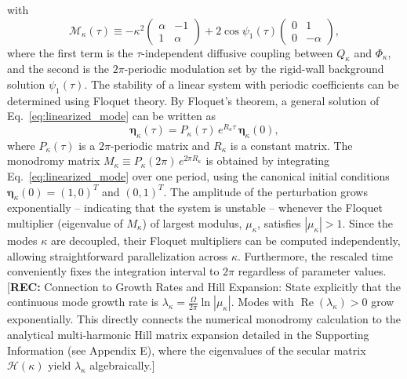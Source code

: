 \documentclass[prb,aps,twocolumn,superscriptaddress,floatfix]{revtex4-1}
\newcommand{\rec}[1]{{\color{magenta}[\textbf{REC:} #1]}}
\begin{document}
%
with
%
\begin{equation}
    \mathcal{M}_\kappa(\tau) \equiv -\kappa^2
    \begin{pmatrix}
    \alpha & -1 \\
    1 & \alpha
    \end{pmatrix}
    + 2\cos\psi_1(\tau)
    \begin{pmatrix}
    0 & 1 \\
    0 & -\alpha
    \end{pmatrix},
    \label{eq:stability_matrix_split}
\end{equation}
%
where the first term is the $\tau$-independent diffusive coupling between $Q_\kappa$ and $\Phi_\kappa$, and the second is the $2\pi$-periodic modulation set by the rigid-wall background solution $\psi_1(\tau)$. The stability of a linear system with periodic coefficients can be determined using Floquet theory. By Floquet's theorem, a general solution of Eq.~\eqref{eq:linearized_mode} can be written as
%
\begin{equation}
    \boldsymbol{\eta}_{\kappa}(\tau) = P_\kappa(\tau)\,e^{R_\kappa\tau}\,\boldsymbol{\eta}_\kappa(0),
\end{equation}
%
where $P_\kappa(\tau)$ is a $2\pi$-periodic matrix and $R_\kappa$ is a constant matrix. The monodromy matrix $M_\kappa \equiv P_\kappa(2\pi)\,e^{2\pi R_\kappa}$ is obtained by integrating Eq.~\eqref{eq:linearized_mode} over one period, using the canonical initial conditions $\boldsymbol{\eta}_\kappa(0) = (1,0)^T$ and $(0,1)^T$. The amplitude of the perturbation grows exponentially -- indicating that the system is unstable -- whenever the Floquet multiplier (eigenvalue of $M_\kappa$) of largest modulus, $\mu_\kappa$, satisfies $|\mu_\kappa|>1$. Since the modes $\kappa$ are decoupled, their Floquet multipliers can be computed independently, allowing straightforward parallelization across $\kappa$. Furthermore, the rescaled time conveniently fixes the integration interval to $2\pi$ regardless of parameter values.
\rec{Connection to Growth Rates and Hill Expansion: State explicitly that the continuous mode growth rate is $\lambda_\kappa = \frac{\Omega}{2\pi}\ln|\mu_\kappa|$. Modes with $\operatorname{Re}(\lambda_\kappa)>0$ grow exponentially. This directly connects the numerical monodromy calculation to the analytical multi-harmonic Hill matrix expansion detailed in the Supporting Information (see Appendix E), where the eigenvalues of the secular matrix $\mathcal{H}(\kappa)$ yield $\lambda_\kappa$ algebraically.}
\end{document}
